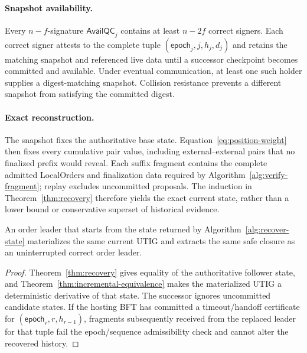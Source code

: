 \paragraph{Snapshot availability.}
Every $n-f$-signature $\mathsf{AvailQC}_j$ contains at least $n-2f$ correct
signers.  Each correct signer attests to the complete tuple
$(\mathsf{epoch}_j,j,h_j,d_j)$ and retains the matching snapshot and referenced
live data until a successor checkpoint becomes committed and available.  Under
eventual communication,
at least one such holder supplies a digest-matching snapshot.  Collision
resistance prevents a different snapshot from satisfying the committed
digest.

\paragraph{Exact reconstruction.}
The snapshot fixes the authoritative base state.  Equation~\eqref{eq:position-weight}
then fixes every cumulative pair value, including external--external pairs
that no finalized prefix would reveal.  Each suffix fragment contains the
complete admitted LocalOrders and finalization data required by
Algorithm~\ref{alg:verify-fragment}; replay excludes uncommitted proposals.
The induction in Theorem~\ref{thm:recovery} therefore yields the exact current
state, rather than a lower bound or conservative superset of historical
evidence.

\begin{corollary}
\label{cor:handoff-continuity}
An order leader that starts from the state returned by
Algorithm~\ref{alg:recover-state} materializes the same current UTIG and
extracts the same safe closure as an uninterrupted correct order leader.
\end{corollary}

\begin{proof}
Theorem~\ref{thm:recovery} gives equality of the authoritative follower state,
and Theorem~\ref{thm:incremental-equivalence} makes the materialized UTIG a
deterministic derivative of that state.  The successor ignores uncommitted
candidate states.  If the hosting BFT has committed a timeout/handoff
certificate for $(\mathsf{epoch}_r,r,h_{r-1})$, fragments subsequently received
from the replaced leader for that tuple fail the epoch/sequence admissibility
check and cannot alter the recovered history.
\end{proof}
